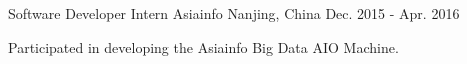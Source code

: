 

\begin{cventries}

  \cventry
    {Software Developer Intern} %
    {Asiainfo} %
    {Nanjing, China} %
    {Dec. 2015 - Apr. 2016} %
    {
      \begin{cvitems} %
        \item {Participated in developing the Asiainfo Big Data AIO Machine.}
      \end{cvitems}
    }


\end{cventries}